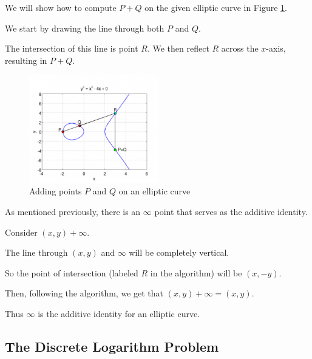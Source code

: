 \begin{example}

    We will show how to compute $P + Q$ on the given elliptic curve in Figure \ref{adding}.

    We start by drawing the line through both $P$ and $Q$.

    The intersection of this line is point $R$.  We then reflect $R$ across the
    $x$-axis, resulting in $P + Q$.

    \begin{figure}[h!]
        \caption{Adding points $P$ and $Q$ on an elliptic curve \cite{kakaroto}}\label{adding}
        \centering
        \includegraphics[width=0.5\textwidth]{elliptic_curve_addition.png}
    \end{figure}

\end{example}





\begin{example}
As mentioned previously, there is an $\infty$ point that serves as the additive identity.

Consider $(x,y) + \infty$.

The line through $(x,y)$ and $\infty$ will be completely vertical.

So the point of intersection (labeled $R$ in the algorithm) will be $(x,-y)$.

Then, following the algorithm, we get that $(x,y) + \infty = (x,y)$.

Thus $\infty$ is the additive identity for an elliptic curve.
\end{example}




\subsection{The Discrete Logarithm Problem}

